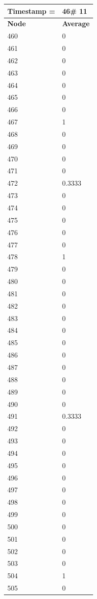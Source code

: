\begin{tabular}{|l||l|}
\hline
\textbf{Timestamp =} & \textbf{46}\# 11\\\hline
	\textbf{Node} & \textbf{Average} \\ \hline
\hline
	460 & 0 \\ \hline
	461 & 0 \\ \hline
	462 & 0 \\ \hline
	463 & 0 \\ \hline
	464 & 0 \\ \hline
	465 & 0 \\ \hline
	466 & 0 \\ \hline
	467 & 1 \\ \hline
	468 & 0 \\ \hline
	469 & 0 \\ \hline
	470 & 0 \\ \hline
	471 & 0 \\ \hline
	472 & 0.3333 \\ \hline
	473 & 0 \\ \hline
	474 & 0 \\ \hline
	475 & 0 \\ \hline
	476 & 0 \\ \hline
	477 & 0 \\ \hline
	478 & 1 \\ \hline
	479 & 0 \\ \hline
	480 & 0 \\ \hline
	481 & 0 \\ \hline
	482 & 0 \\ \hline
	483 & 0 \\ \hline
	484 & 0 \\ \hline
	485 & 0 \\ \hline
	486 & 0 \\ \hline
	487 & 0 \\ \hline
	488 & 0 \\ \hline
	489 & 0 \\ \hline
	490 & 0 \\ \hline
	491 & 0.3333 \\ \hline
	492 & 0 \\ \hline
	493 & 0 \\ \hline
	494 & 0 \\ \hline
	495 & 0 \\ \hline
	496 & 0 \\ \hline
	497 & 0 \\ \hline
	498 & 0 \\ \hline
	499 & 0 \\ \hline
	500 & 0 \\ \hline
	501 & 0 \\ \hline
	502 & 0 \\ \hline
	503 & 0 \\ \hline
	504 & 1 \\ \hline
	505 & 0 \\ \hline
\end{tabular}
